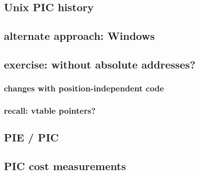 \subsection{Unix PIC history}


\subsection{alternate approach: Windows}


\subsection{exercise: without absolute addresses?}


\subsubsection{changes with position-independent code}


\subsubsection{recall: vtable pointers?}


\subsection{PIE / PIC}


\subsection{PIC cost measurements}

